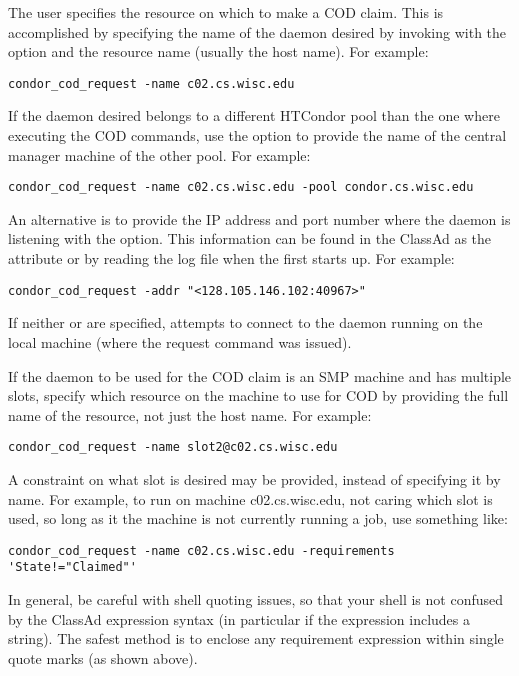 The user specifies the resource on which to make a COD claim.
This is accomplished by specifying the name of the
 daemon desired by invoking
 with the  option and the
resource name (usually the host name).
For example:
\begin{verbatim}
condor_cod_request -name c02.cs.wisc.edu
\end{verbatim}

If the  daemon desired belongs to a different HTCondor
pool than the one where executing the COD commands,
use the  option to provide the name of the central manager
machine of the other pool.  For example:
\begin{verbatim}
condor_cod_request -name c02.cs.wisc.edu -pool condor.cs.wisc.edu
\end{verbatim}

An alternative is to provide the IP address and port number
where the  daemon is listening
with the  option.
This information can be found in the  ClassAd as the
attribute  or by reading the log file when the
 first starts up.
For example:
\begin{verbatim}
condor_cod_request -addr "<128.105.146.102:40967>"
\end{verbatim}
  
If neither  or  are specified,
 attempts to connect to the 
daemon running
on the local machine (where the request command was issued).

If the  daemon to be used for the COD claim is an SMP
machine and has multiple slots, specify which resource on
the machine to use for COD by providing the full name of the resource,
not just the host name.
For example:
\begin{verbatim}
condor_cod_request -name slot2@c02.cs.wisc.edu
\end{verbatim}

A constraint on what slot is desired may be provided,
instead of specifying it by name.  
For example, to run on machine c02.cs.wisc.edu,
not caring which slot is used,
so long as it the machine is not currently running a job,
use something like:
\begin{verbatim}
condor_cod_request -name c02.cs.wisc.edu -requirements 'State!="Claimed"'
\end{verbatim}

In general, be careful with shell quoting issues, so that
your shell is not confused by the ClassAd expression syntax (in
particular if the expression includes a string).
The safest method is to enclose any requirement expression
within single quote marks (as shown above).
 
